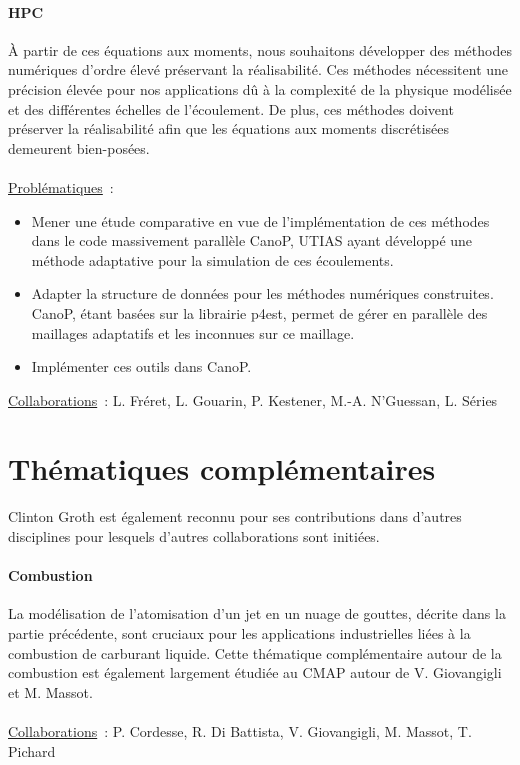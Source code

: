 \documentclass[12pt]{article}
\begin{document}
\paragraph{HPC \\ }  À partir de ces équations aux moments, nous souhaitons développer des méthodes numériques d'ordre élevé préservant la réalisabilité. Ces méthodes nécessitent une précision élevée pour nos applications dû à la complexité de la physique modélisée et des différentes échelles de l'écoulement. De plus, ces méthodes doivent préserver la réalisabilité afin que les équations aux moments discrétisées demeurent bien-posées. \\ \\
% 
\underline{Problématiques}~:
\begin{itemize}
\item Mener une étude comparative en vue de l'implémentation de ces méthodes dans le code massivement parallèle CanoP, UTIAS ayant développé une méthode adaptative pour la simulation de ces écoulements.
\item Adapter la structure de données pour les méthodes numériques construites. CanoP, étant basées sur la librairie p4est, permet de gérer en parallèle des maillages adaptatifs et les inconnues sur ce maillage. %
\item Implémenter ces outils dans CanoP. \\
\end{itemize}
\underline{Collaborations}~: L. Fréret, L. Gouarin, P. Kestener, M.-A. N'Guessan, L. Séries


\section*{Thématiques complémentaires}
Clinton Groth est également reconnu pour ses contributions dans d'autres disciplines pour lesquels d'autres collaborations sont initiées.

\paragraph{Combustion \\ }
La modélisation de l'atomisation d'un jet en un nuage de gouttes, décrite dans la partie précédente, sont cruciaux pour les applications industrielles liées à la combustion de carburant liquide. Cette thématique complémentaire autour de la combustion est également largement étudiée au CMAP autour de V. Giovangigli et M. Massot. \\ \\
%
\underline{Collaborations}~: P. Cordesse, R. Di Battista, V. Giovangigli, M. Massot, T. Pichard 
\end{document}
